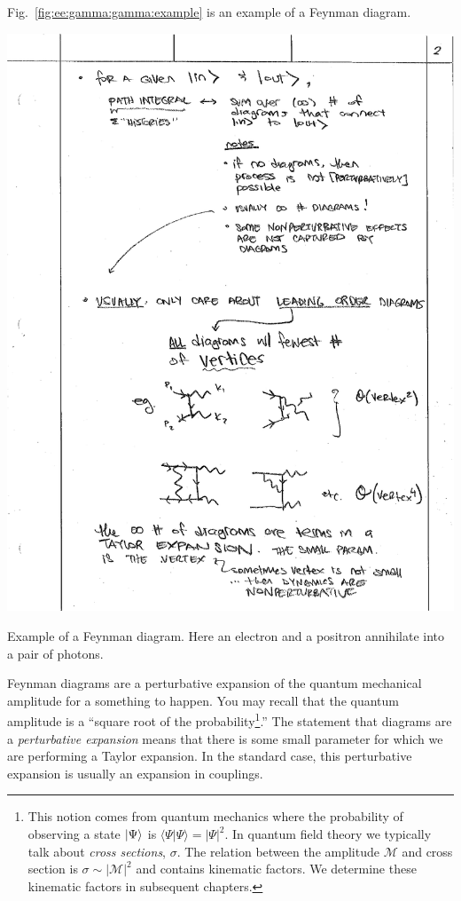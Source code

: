 \documentclass[12pt, oneside]{report}    %
\begin{document}
Fig.~\ref{fig:ee:gamma:gamma:example} is an example of a Feynman diagram.
\begin{marginfigure}%
    \includegraphics[width=.8\textwidth]{figures/feyn_eegaga.pdf}
    \caption{Example of a Feynman diagram. Here an electron and a positron annihilate into a pair of photons.}
    \label{fig:ee:gamma:gamma:example}
\end{marginfigure}
Feynman diagrams are a perturbative expansion of the quantum mechanical amplitude for a something to happen. You may recall that the quantum amplitude is a ``square root of the probability\footnote{This notion comes from quantum mechanics where the probability of observing a state $\left|\Psi\right\rangle$ is $\langle \Psi | \Psi\rangle = |\Psi|^2$. In quantum field theory we typically talk about \emph{cross sections}, $\sigma$. The relation between the amplitude $\mathcal M$ and cross section is $\sigma \sim |\mathcal M|^2$ and contains kinematic factors. We determine these kinematic factors in subsequent chapters.}.'' The statement that diagrams are a \emph{perturbative expansion} means that there is some small parameter for which we are performing a Taylor expansion. In the standard case, this perturbative expansion is usually an expansion in couplings.
\end{document}
